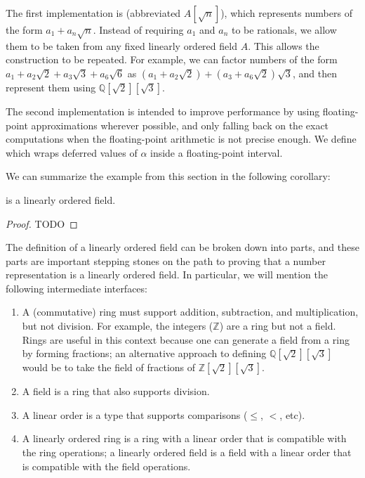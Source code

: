 The first implementation is  (abbreviated $A[\sqrt{n}]$),
which represents numbers of the form $a_1 + a_n\sqrt{n}$. Instead of requiring
$a_1$ and $a_n$ to be rationals, we allow them to be taken from any fixed
linearly ordered field $A$.  This allows the construction to be repeated. For
example, we can factor numbers of the form $a_1 + a_2\sqrt{2} + a_3\sqrt{3} +
a_6\sqrt{6}$ as $(a_1 + a_2\sqrt{2}) + (a_3 + a_6\sqrt{2})\sqrt{3}$, and then
represent them using $ℚ[\sqrt{2}][\sqrt{3}]$.

The second implementation is intended to improve performance by using
floating-point approximations wherever possible, and only falling back on the
exact computations when the floating-point arithmetic is not precise enough. We
define  which wraps deferred values of $α$
inside a floating-point interval.

We can summarize the example from this section in the following corollary:
\begin{corollary}
  \label{thm:numberType}
   is a linearly ordered field.
\end{corollary}

\begin{proof}
  TODO
\end{proof}

The definition of a linearly ordered field can be broken down into parts, and
these parts are important stepping stones on the path to proving that a number
representation is a linearly ordered field. In particular, we will mention the
following intermediate interfaces:

\begin{enumerate}
\item A (commutative) ring must support addition, subtraction, and
multiplication, but not division. For example, the integers ($ℤ$) are a ring
but not a field. Rings are useful in this context because one can generate a
field from a ring by forming fractions; an alternative approach to defining
$ℚ[\sqrt{2}][\sqrt{3}]$ would be to take the field of fractions of
$ℤ[\sqrt{2}][\sqrt{3}]$.

\item A field is a ring that also supports division.

\item A linear order is a type that supports comparisons ($≤$, $<$, etc).

\item A linearly ordered ring is a ring with a linear order that is compatible
with the ring operations; a linearly ordered field is a field with a linear
order that is compatible with the field operations.
\end{enumerate}

